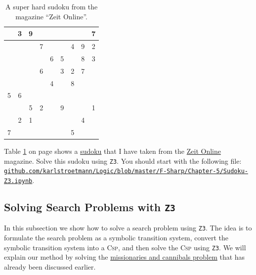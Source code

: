 \begin{table}[h]
  \centering
  \begin{tabular}{||c|c|c||c|c|c||c|c|c||}
    \hline
    \hline
      & 3 & 9 &   &   &   &   &   & 7 \\
    \hline
      &   &   & 7 &   &   & 4 & 9 & 2 \\
    \hline
      &   &   &   & 6 & 5 &   & 8 & 3 \\
    \hline
    \hline
      &   &   & 6 &   & 3 & 2 & 7 &   \\
    \hline
      &   &   &   & 4 &   & 8 &   &   \\
    \hline
    5 & 6 &   &   &   &   &   &   &   \\
    \hline
    \hline
      &   & 5 & 2 &   & 9 &   &   & 1 \\
    \hline
      & 2 & 1 &   &   &   &   & 4 &   \\
    \hline
    7 &   &   &   &   &   & 5 &   &   \\
    \hline
    \hline
  \end{tabular}
  \caption{A super hard sudoku from the magazine ``Zeit Online''.}
  \label{tab:sudoku}
\end{table}


\exerciseEng
{}
Table \ref{tab:sudoku} on page \pageref{tab:sudoku} shows a \href{https://en.wikipedia.org/wiki/Sudoku}{sudoku}
that I have taken from the
\href{http://sudoku.zeit.de/cgi-bin/sudoku/sudoku_kd_app_2016.pl?action=level&kd_nr=24091123601092&year=2018&month=03&day=23&level=-c+5}{Zeit Online}
magazine.
Solve this sudoku using \texttt{Z3}.  You should start with the following file:
\\[0.2cm]
\href{https://github.com/karlstroetmann/Logic/blob/master/F-Sharp/Chapter-5/Sudoku-Z3.ipynb}{\small\texttt{github.com/karlstroetmann/Logic/blob/master/F-Sharp/Chapter-5/Sudoku-Z3.ipynb}}.
    \eox

\subsection{Solving Search Problems with \texttt{Z3}}
In this subsection we show how to solve a search problem using \texttt{Z3}.  The idea is to formulate the
search problem as a symbolic transition system, convert the symbolic transition system into a \textsc{Csp}, and
then solve the \textsc{Csp} using \texttt{Z3}.
We will explain our method by solving the
\href{https://en.wikipedia.org/wiki/Missionaries_and_cannibals_problem}{missionaries and cannibals problem}
that has already been discussed earlier.  

